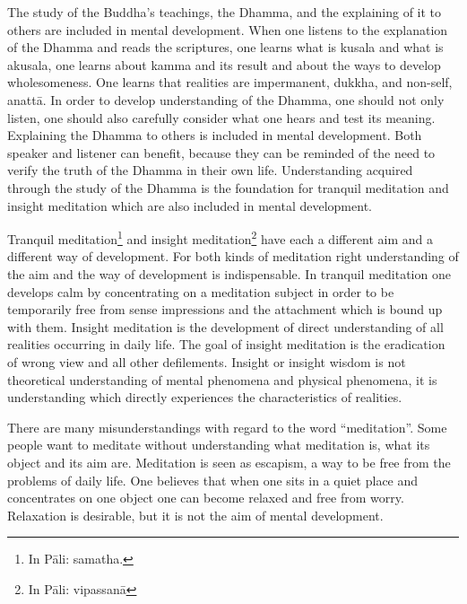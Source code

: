 \documentclass{book}
\begin{document}
The study of the Buddha's teachings, the Dhamma, and the explaining of
it to others are included in mental development. When one listens to the
explanation of the Dhamma and reads the scriptures, one learns what is
kusala and what is akusala, one learns about kamma and its result and
about the ways to develop wholesome­ness. One learns that realities 
are impermanent, dukkha, and non-self, anattā. In order to develop under­standing of the Dhamma, one should not only listen, one
should also carefully consider what one hears and test its meaning.
Explaining the Dhamma to others is included in mental development. Both
speaker and listener can bene­fit, because they can be reminded of the
need to verify the truth of the Dhamma in their own life. Understanding
acquired through the study of the Dhamma is the founda­tion for tranquil
meditation and insight meditation which are also included in mental
development.

Tranquil meditation\footnote{In Pāli: samatha.} and insight
meditation\footnote{In Pāli: vipassanā} have each a different aim and    a different way of development. For both kinds of meditation right
understanding of the aim and the way of development is indispensable. In
tranquil meditation one develops calm by concentrating on a meditation
subject in order to be temporarily free from sense impressions and the
attachment which is bound up with them. Insight meditation is the
development of direct understanding of all realities occurring in daily
life. The goal of insight meditation is the eradication of wrong view
and all other defilements. Insight or insight wisdom is not theoretical
understanding of mental phenomena and physical phenomena, it is
understanding which directly experiences the characteristics of
realities.

There are many misunderstandings with regard to the word ``meditation''.
Some people want to meditate without understanding what meditation is,
what its object and its aim are. Meditation is seen as escapism, a way
to be free from the problems of daily life. One believes that when one
sits in a quiet place and concentrates on one object one can become
relaxed and free from worry. Relaxation is desirable, but it is not the
aim of mental development.
\end{document}
